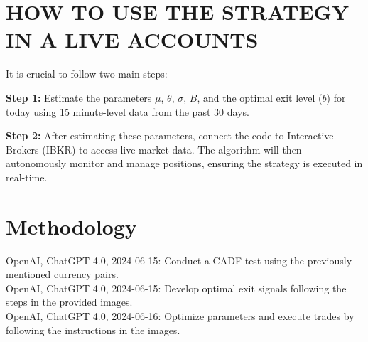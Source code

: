 \documentclass{article}
\begin{document}
\section{HOW TO USE THE STRATEGY IN A LIVE ACCOUNTS}
It is crucial to follow two main steps:

\textbf{Step 1:} Estimate the parameters \( \mu \), \( \theta \), \( \sigma \), \( B \), and the optimal exit level (\( b \)) for today using 15 minute-level data from the past 30 days.

\textbf{Step 2:} After estimating these parameters, connect the code to Interactive Brokers (IBKR) to access live market data. The algorithm will then autonomously monitor and manage positions, ensuring the strategy is executed in real-time.
\clearpage


\section{Methodology}

OpenAI, ChatGPT 4.0, 2024-06-15: Conduct a CADF test using the previously mentioned currency pairs.\\
OpenAI, ChatGPT 4.0, 2024-06-15: Develop optimal exit signals following the steps in the provided images.\\
OpenAI, ChatGPT 4.0, 2024-06-16: Optimize parameters and execute trades by following the instructions in the images.\\
\end{document}

